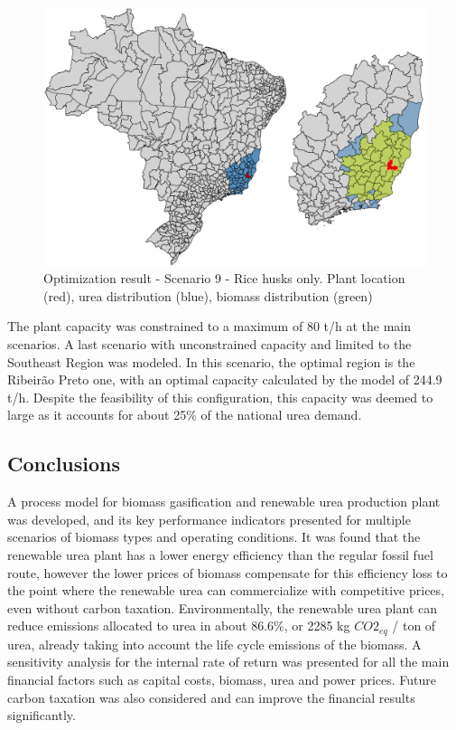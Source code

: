 \documentclass[a4paper, titlepage]{article}
\begin{document}
\begin{figure}
	\includegraphics[width=\textwidth]{img/optimization_result_9.png}
	\caption{Optimization result - Scenario 9 - Rice husks only. Plant location (red), urea distribution (blue), biomass distribution (green)}
	\label{img_optimizationresults_9}
\end{figure}


The plant capacity was constrained to a maximum of 80 t/h at the main scenarios. A last scenario with unconstrained
capacity and limited to the Southeast Region was modeled. In this scenario, the optimal region is the Ribeirão Preto one,
with an optimal capacity calculated by the model of 244.9 t/h. Despite the feasibility of this configuration, this capacity
was deemed to large as it accounts for about 25\% of the national urea demand.

\subsection{Conclusions}

A process model for biomass gasification and renewable urea production plant was developed, and its key performance
indicators presented for multiple scenarios of biomass types and operating conditions. It was found that the renewable
urea plant has a lower energy efficiency than the regular fossil fuel route, however the lower prices of biomass compensate
for this efficiency loss to the point where the renewable urea can commercialize with competitive prices, even without
carbon taxation. Environmentally, the renewable urea plant can reduce emissions allocated to urea in about 86.6\%, or
2285 kg $CO2_{eq}$ / ton of urea, already taking into account the life cycle emissions of the biomass. A sensitivity
analysis for the internal rate of return was presented for all the main financial factors such as capital costs,
biomass, urea and power prices. Future carbon taxation was also considered and can improve the financial results
significantly.
\end{document}
